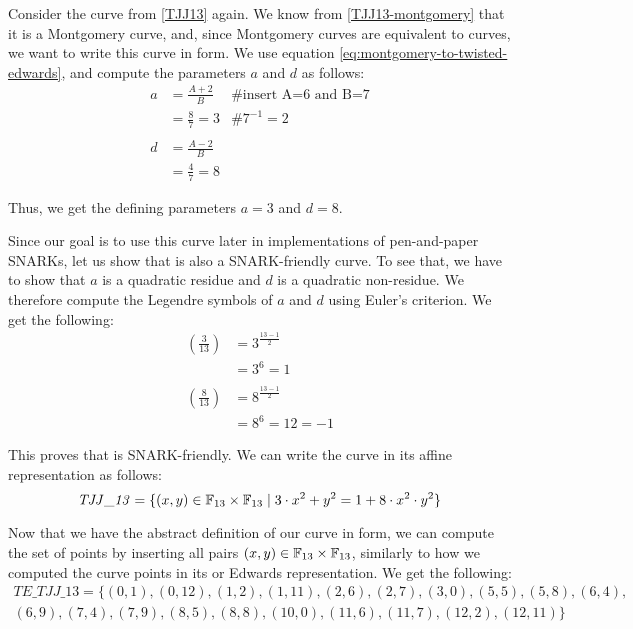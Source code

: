 \begin{example}Consider the  curve from \examplename{} \ref{TJJ13} again. We know from \examplename{} \ref{TJJ13-montgomery} that it is a Montgomery curve, and, since Montgomery curves are equivalent to  curves, we want to write this curve in  form. We use equation \eqref{eq:montgomery-to-twisted-edwards}, and compute the parameters $a$ and $d$ as follows:
\begin{align*}
a & = \frac{A+2}{B} & \text{\# insert A=6 and B=7}\\
  & = \frac{8}{7} = 3 & \text{\# } 7^{-1}= 2 \\
  \\
d & = \frac{A-2}{B} \\
  & = \frac{4}{7} = 8 
\end{align*}

Thus, we get the defining parameters  $a= 3$ and $d=8$. 

Since our goal is to use this curve later in implementations of pen-and-paper SNARKs, let us show that  is also a SNARK-friendly  curve. To see that, we  have to show that $a$ is a quadratic residue and $d$ is a quadratic non-residue. We therefore compute the Legendre symbols of $a$ and $d$ using Euler's criterion. We get the following:
\begin{align*}
\left(\frac{3}{13}\right) &= 3^{\frac{13-1}{2}} \\
                          & = 3^6 
                            = 1\\
                          \\
\left(\frac{8}{13}\right) &= 8^{\frac{13-1}{2}} \\
                          & = 8^6 
                            = 12
                            = -1                     
\end{align*}

This proves that  is SNARK-friendly. We can write the  curve in its affine  representation as follows:
\begin{equation}\label{TJJ13-twisted-edwards}
\mathit{TJJ\_13} = \{(x,y)\in \mathbb{F}_{13}\times \mathbb{F}_{13}\;|\; 3\cdot x^{2} + y^2 =1+ 8\cdot x^{2}\cdot y^2 \}
\end{equation}

Now that we have the abstract definition of our  curve in  form, we can compute the set of points by inserting all pairs $(x,y)\in\mathbb{F}_{13}\times \mathbb{F}_{13}$, similarly to how we computed the curve points in its  or Edwards representation. We get the following:
\begin{equation}
\begin{split}
\mathit{TE\_TJJ\_13} = \{(0, 1),(0, 12),(1, 2),(1, 11),(2, 6),(2, 7),(3, 0),(5, 5),(5, 8),(6, 4),\\
(6, 9),(7, 4),(7, 9),(8, 5),(8, 8),(10, 0),(11, 6),(11, 7),(12, 2),(12, 11)\}
\end{split}
\end{equation}


\end{example}
